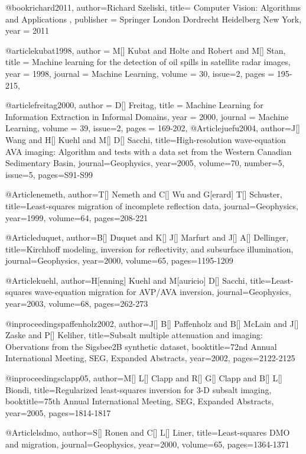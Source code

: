 @book{richard2011,
  author={Richard Szeliski},
  title={ Computer Vision: Algorithms and Applications },
  publisher = 	 {Springer London Dordrecht Heidelberg New York},
  year = 	 2011
}

@article{kubat1998,
author = {M[] Kubat and Holte and Robert and M[] Stan},
title = {Machine learning for the detection of oil spills in satellite radar images},
year = {1998},
journal = {Machine Learning},
volume = {30},
issue=2,
pages = {195-215},
}

@article{freitag2000,
author = {D[] Freitag},
title = {Machine Learning for Information Extraction in Informal Domains},
year = {2000},
journal = {Machine Learning},
volume = {39},
issue=2,
pages = {169-202},
}
@Article{juefu2004,
	author={J[] Wang and H[] Kuehl and M[] D[] Sacchi},
	title={High-resolution wave-equation {AVA} imaging: {A}lgorithm and tests with a data set from the {W}estern {C}anadian {S}edimentary {B}asin},
	journal={Geophysics},
	year=2005,
	volume=70,
	number=5,
	issue=5,
	pages={S91-S99}
}


@Article{nemeth,
	author={T[] Nemeth and C[] Wu and G[erard] T[] Schuster},
	title={Least-squares migration of incomplete reflection data},
	journal={Geophysics},
	year=1999,
	volume=64,
	pages={208-221}
}

@Article{duquet,
	author={B[] Duquet and K[] J[] Marfurt and J[] A[] Dellinger},
	title={Kirchhoff modeling, inversion for reflectivity, and subsurface illumination},
	journal={Geophysics},
	year=2000,
	volume=65,
	pages={1195-1209}
}

@Article{kuehl,
	author={H[enning] Kuehl and M[auricio] D[] Sacchi},
	title={Least-squares wave-equation migration for {AVP/AVA} inversion},
	journal={Geophysics},
	year=2003,
	volume=68,
	pages={262-273}
}

@inproceedings{paffenholz2002,
	author={J[] B[] Paffenholz and B[] McLain and J[] Zaske and P[] Keliher},
	title={Subsalt multiple attenuation and imaging: Obervations from the {Sigsbee2B} synthetic dataset},
	booktitle={72nd Annual International Meeting, SEG, Expanded Abstracts},
	year=2002,
	pages={2122-2125}
}

@inproceedings{clapp05,
	author={M[] L[] Clapp and R[] G[] Clapp and B[] L[] Biondi},
    title={Regularized least-squares inversion for 3-{D} subsalt imaging},
	booktitle={75th Annual International Meeting, SEG, Expanded Abstracts},
	year=2005,
	pages={1814-1817}
}

@Article{lsdmo,
	author={S[] Ronen and C[] L[] Liner},
	title={Least-squares {DMO} and migration},
	journal={Geophysics},
	year=2000,
	volume=65,
	pages={1364-1371}
}

